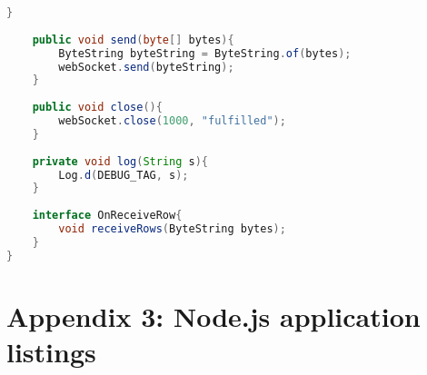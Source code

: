 \documentclass[hidelinks,11pt,a4paper,oneside,article]{memoir}
\begin{document}
\begin{lstlisting}[label={listing:websocketconnection},caption={WebsocketConnection class, makes a websocket connection},language=Java, style=styleprogrammingappendix]
    }
    
    public void send(byte[] bytes){
        ByteString byteString = ByteString.of(bytes);
        webSocket.send(byteString);
    }
    
    public void close(){
        webSocket.close(1000, "fulfilled");
    }
    
    private void log(String s){
        Log.d(DEBUG_TAG, s);
    }
    
    interface OnReceiveRow{
        void receiveRows(ByteString bytes);
    }
}
\end{lstlisting}\vspace{14pt}

\clearpage
{}

\chapter{Appendix 3: Node.js application listings}\label{appx:nodejsapp}

\end{document}
